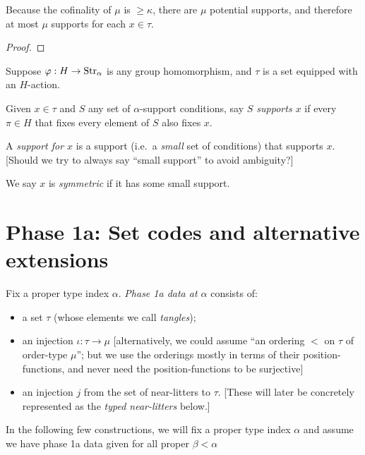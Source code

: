 \begin{lemma}
\label {lem:count-supports}
\leanok
Because the cofinality of $\mu$ is $\geq \kappa$, there are $\mu$ potential supports, and therefore at most $\mu$ supports for each $x \in \tau$.
\end{lemma}
\begin{proof}\leanok\end{proof}

\begin{definition}
\label{def:support-of}
  \leanok
  Suppose $\varphi : H \to \mathrm{Str}_\alpha$ is any group homomorphism, and $\tau$ is a set equipped with an $H$-action.

  Given $x \in \tau$ and $S$ any set of $\alpha$-support conditions, say \emph{$S$ supports $x$} if every $\pi \in H$ that fixes every element of $S$ also fixes $x$.

  A \emph{support for $x$} is a support (i.e.\ a \emph{small} set of conditions) that supports $x$. [Should we try to always say “small support” to avoid ambiguity?]

  We say $x$ is \emph{symmetric} if it has some small support.
\end{definition}

\section{Phase 1a: Set codes and alternative extensions}


\begin{definition}
\label {def:phase-1a-data}
\leanok
Fix a proper type index $\alpha$.  \emph{Phase 1a data at $\alpha$} consists of:

\begin{itemize}
  \item a set $\tau$ (whose elements we call \emph{tangles});
  \item an injection $\iota : \tau \to \mu$ [alternatively, we could assume “an ordering $<$ on $\tau$ of order-type $\mu$”; but we use the orderings mostly in terms of their position-functions, and never need the position-functions to be surjective]
  \item an injection $j$ from the set of near-litters to $\tau$. [These will later be concretely represented as the \emph{typed near-litters} below.]
\end{itemize}

In the following few constructions, we will fix a proper type index $\alpha$ and assume we have phase 1a data given for all proper $\beta < \alpha$
\end{definition}

